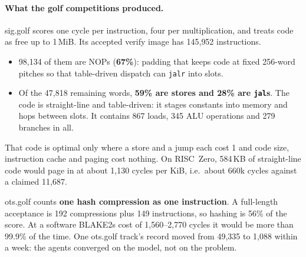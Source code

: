\paragraph{What the golf competitions produced.} sig.golf scores one cycle per instruction, four per
multiplication, and treats code as free up to 1\,MiB. Its accepted verify image has 145{,}952
instructions.
\begin{itemize}[nosep]
\item 98{,}134 of them are NOPs (\textbf{67\%}): padding that keeps code at fixed 256-word pitches so
  that table-driven dispatch can \texttt{jalr} into slots.
\item Of the 47{,}818 remaining words, \textbf{59\% are stores and 28\% are \texttt{jal}s}. The code is
  straight-line and table-driven: it stages constants into memory and hops between slots. It contains
  867 loads, 345 ALU operations and 279 branches in all.
\end{itemize}
That code is optimal only where a store and a jump each cost 1 and code size, instruction cache and
paging cost nothing. On RISC~Zero, 584\,KB of straight-line code would page in at about 1{,}130 cycles
per KiB, i.e.\ about 660k cycles against a claimed 11{,}687.

ots.golf counts \textbf{one hash compression as one instruction}. A full-length acceptance is 192
compressions plus 149 instructions, so hashing is 56\% of the score. At a software BLAKE2s cost of
1{,}560--2{,}770 cycles it would be more than 99.9\% of the time. One ots.golf track's record moved from
49{,}335 to 1{,}088 within a week: the agents converged on the model, not on the problem.

